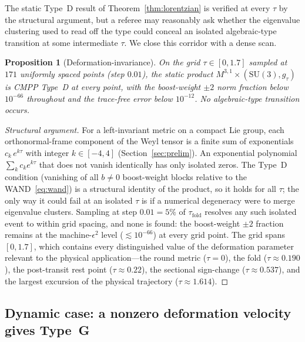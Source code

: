 \documentclass[12pt]{article}
\newtheorem{proposition}[theorem]{Proposition}
\theoremstyle{definition}
\theoremstyle{remark}
\begin{document}
The static Type~D result of Theorem~\ref{thm:lorentzian} is verified at every $\tau$ by the structural argument, but a referee may reasonably ask whether the eigenvalue clustering used to read off the type could conceal an isolated algebraic-type transition at some intermediate $\tau$.  We close this corridor with a dense scan.

\begin{proposition}[Deformation-invariance]
\label{prop:dense}
On the grid $\tau\in[0,1.7]$ sampled at $171$ uniformly spaced points (step $0.01$), the static product $M^{3,1}\times(\mathrm{SU}(3),g_\tau)$ is CMPP Type~D at every point, with the boost-weight $\pm2$ norm fraction below $10^{-66}$ throughout and the trace-free error below $10^{-12}$.  No algebraic-type transition occurs.
\end{proposition}

\begin{proof}[Structural argument]
For a left-invariant metric on a compact Lie group, each orthonormal-frame component of the Weyl tensor is a finite sum of exponentials $c_k\,e^{k\tau}$ with integer $k\in[-4,4]$ (Section~\ref{sec:prelim}).  An exponential polynomial $\sum_k c_k e^{k\tau}$ that does not vanish identically has only isolated zeros.  The Type~D condition (vanishing of all $b\neq0$ boost-weight blocks relative to the WAND~\eqref{eq:wand}) is a structural identity of the product, so it holds for all $\tau$; the only way it could fail at an isolated $\tau$ is if a numerical degeneracy were to merge eigenvalue clusters.  Sampling at step $0.01=5\%$ of $\tau_{\mathrm{fold}}$ resolves any such isolated event to within grid spacing, and none is found: the boost-weight $\pm2$ fraction remains at the machine-$\epsilon^2$ level ($\lesssim10^{-66}$) at every grid point.  The grid spans $[0,1.7]$, which contains every distinguished value of the deformation parameter relevant to the physical application---the round metric ($\tau=0$), the fold ($\tau\approx0.190$), the post-transit rest point ($\tau\approx0.22$), the sectional sign-change ($\tau\approx0.537$), and the largest excursion of the physical trajectory ($\tau\approx1.614$).
\end{proof}

\subsection{Dynamic case: a nonzero deformation velocity gives Type~G}
\label{subsec:dynamic}
\end{document}
